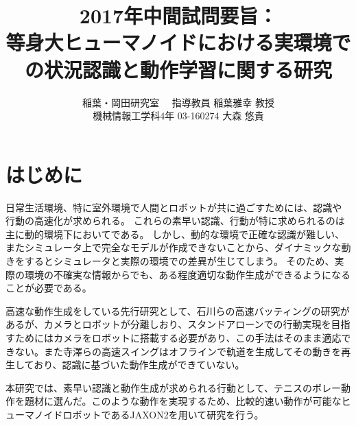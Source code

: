\documentclass[twocolumn]{preport}
\title{2017年中間試問要旨：\\
等身大ヒューマノイドにおける実環境での状況認識と動作学習に関する研究}
\author{稲葉・岡田研究室 　指導教員 稲葉雅幸 教授\\
  機械情報工学科4年 03-160274 大森 悠貴 }
\begin{document}
\pagestyle{empty}
\maketitle
\thispagestyle{empty}
\sloppy

\section{はじめに}
日常生活環境、特に室外環境で人間とロボットが共に過ごすためには、認識や行動の高速化が求められる。
これらの素早い認識、行動が特に求められるのは主に動的環境下においてである。
しかし、動的な環境で正確な認識が難しい、またシミュレータ上で完全なモデルが作成できないことから、ダイナミックな動きをするとシミュレータと実際の環境での差異が生じてしまう。
そのため、実際の環境の不確実な情報からでも、ある程度適切な動作生成ができるようになることが必要である。

高速な動作生成をしている先行研究として、石川ら\cite{Ishikawa}の高速バッティングの研究があるが、カメラとロボットが分離しおり、スタンドアローンでの行動実現を目指すためにはカメラをロボットに搭載する必要があり、この手法はそのまま適応できない。また寺澤ら\cite{Terasawa}の高速スイングはオフラインで軌道を生成してその動きを再生しており、認識に基づいた動作生成ができていない。

本研究では、素早い認識と動作生成が求められる行動として、テニスのボレー動作を題材に選んだ。このような動作を実現するため、比較的速い動作が可能なヒューマノイドロボットであるJAXON2\cite{Kojima}を用いて研究を行う。







\end{document}
